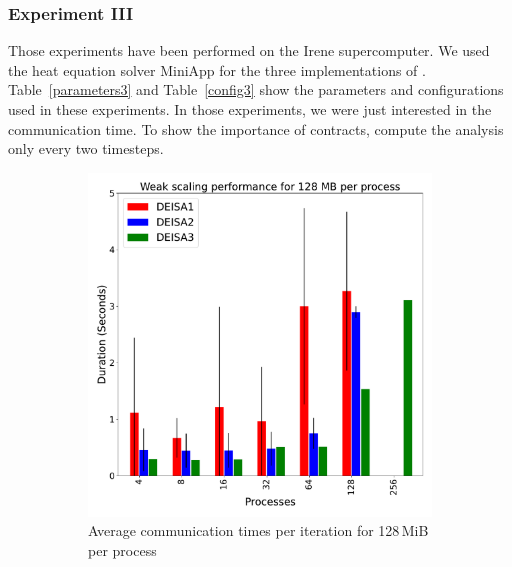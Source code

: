 \subsubsection{Experiment III}\label{XP3}
Those experiments have been performed on the Irene supercomputer. We  used the heat equation solver MiniApp for the three implementations of \deisa. Table~\ref{parameters3}  and Table~\ref{config3} show the parameters and configurations used in these experiments. 
In those experiments, we were just interested in the communication time. 
To show the importance of contracts, compute the analysis only every two timesteps.
 
\begin{figure}[h!]
     \centering
     \begin{subfigure}[b]{0.4\textwidth}
         \centering
         \includegraphics[width=\textwidth, height=\textwidth]{figures/128MB_1vs2vs3.pdf}
         \caption{Average communication times per iteration for 128\,MiB per process}
         \label{fig:X2_128}
     \end{subfigure}
     \hfill
     \begin{subfigure}[b]{0.4\textwidth}
         \centering

\end{subfigure}
\end{figure}

